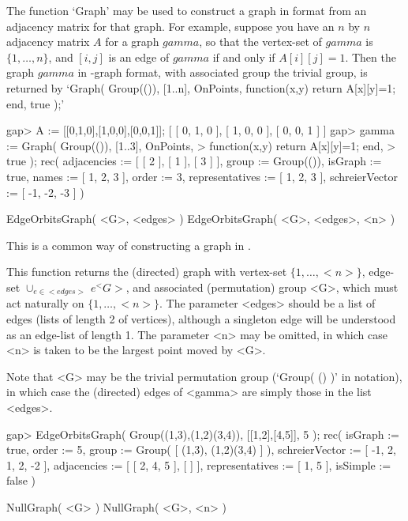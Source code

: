 The function `Graph' may be used to construct a graph in {\GRAPE} format
from an adjacency matrix for that graph. For
example, suppose you have an $n$ by $n$ adjacency matrix $A$ for a graph
$gamma$, so that the vertex-set of $gamma$ is $\{1,\ldots,n\}$, and
$[i,j]$ is an edge of $gamma$ if and only if $A[i][j]=1$.  Then the graph
$gamma$ in {\GRAPE}-graph format, with associated group the trivial group,
is returned by `Graph( Group(()), [1..n], OnPoints, function(x,y) return
A[x][y]=1; end, true );'

\beginexample
gap> A := [[0,1,0],[1,0,0],[0,0,1]];
[ [ 0, 1, 0 ], [ 1, 0, 0 ], [ 0, 0, 1 ] ]
gap> gamma := Graph( Group(()), [1..3], OnPoints,
>        function(x,y) return A[x][y]=1; end,
>        true );
rec( adjacencies := [ [ 2 ], [ 1 ], [ 3 ] ], group := Group(()), 
  isGraph := true, names := [ 1, 2, 3 ], order := 3,
  representatives := [ 1, 2, 3 ], schreierVector := [ -1, -2, -3 ] )
\endexample


\>EdgeOrbitsGraph( <G>, <edges> )
\>EdgeOrbitsGraph( <G>, <edges>, <n> )

This is a common way of constructing a graph in {\GRAPE}.

This function returns the (directed) graph with vertex-set $\{1,\ldots,
<n>\}$, edge-set $\cup_{e\in <edges>}\, e^<G>$, and associated
(permutation) group <G>, which must act naturally on $\{1,\ldots,<n>\}$.
The parameter <edges> should be a list of edges (lists of length 2 of
vertices), although a singleton edge will be understood as an edge-list
of length 1. The parameter <n> may be omitted, in which case <n> is
taken to be the largest point moved by <G>.

Note that <G> may be the trivial permutation group (`Group( () )' in
{\GAP} notation), in which case the (directed) edges of <gamma> are
simply those in the list <edges>.

\beginexample
gap> EdgeOrbitsGraph( Group((1,3),(1,2)(3,4)), [[1,2],[4,5]], 5 );
rec(
  isGraph := true,
  order := 5,
  group := Group( [ (1,3), (1,2)(3,4) ] ),
  schreierVector := [ -1, 2, 1, 2, -2 ],
  adjacencies := [ [ 2, 4, 5 ], [  ] ],
  representatives := [ 1, 5 ],
  isSimple := false )
\endexample


\>NullGraph( <G> )
\>NullGraph( <G>, <n> )

